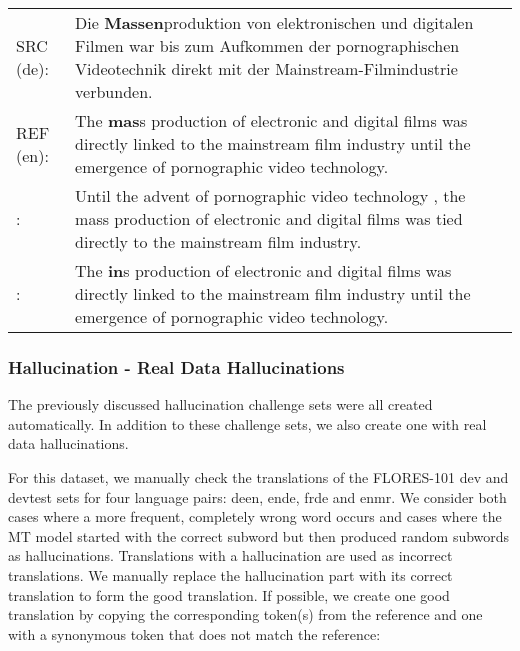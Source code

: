 \documentclass[11pt]{article}
\newcommand{\cmark}{\textcolor{darkpastelgreen}{\ding{51}}}\newcommand{\xmark}{\textcolor{darkpastelred}{\ding{55}}}
\begin{document}
\begin{small}
\vspace{0.5cm}
\setlength{\extrarowheight}{0.1cm}
\begin{tabularx}{0.95\columnwidth}{lX}
     SRC (de): & Die \textbf{Massen}produktion von elektronischen und digitalen Filmen war bis zum Aufkommen der pornographischen Videotechnik direkt mit der Mainstream-Filmindustrie verbunden. \\
     REF (en): &	The \textbf{mas}s production of electronic and digital films was directly linked to the mainstream film industry until the emergence of pornographic video technology.\\
     \cmark: & Until the advent of pornographic video technology , the mass production of electronic and digital films was tied directly to the mainstream film industry.\\
     \xmark: & The \textbf{in}s production of electronic and digital films was directly linked to the mainstream film industry until the emergence of pornographic video technology. \vspace{0.35cm}
\end{tabularx}
\end{small}


\subsubsection{Hallucination - Real Data Hallucinations}
\label{subsec:real_hallucination}
The previously discussed hallucination challenge sets were all created automatically. In addition to these challenge sets, we also create one with real data hallucinations.

For this dataset, we manually check the translations of the FLORES-101 dev and devtest sets for four language pairs: deen, ende, frde and enmr. We consider both cases where a more frequent, completely wrong word occurs and cases where the MT model started with the correct subword but then produced random subwords as hallucinations. Translations with a hallucination are used as incorrect translations. We manually replace the hallucination part with its correct translation to form the good translation. If possible, we create one good translation by copying the corresponding token(s) from the reference and one with a synonymous token that does not match the reference:
\end{document}
